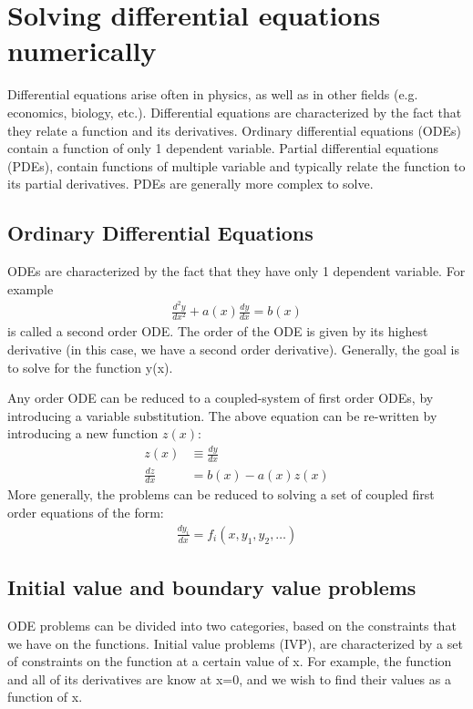 \chapter{Solving differential equations numerically}
Differential equations arise often in physics, as well as in other fields (e.g. economics, biology, etc.). Differential equations are characterized by the fact that they relate a function and its derivatives. Ordinary differential equations (ODEs) contain a function of only 1 dependent variable. Partial differential equations (PDEs), contain functions of multiple variable and typically relate the function to its partial derivatives. PDEs are generally more complex to solve.

\section{Ordinary Differential Equations}
ODEs are characterized by the fact that they have only 1 dependent variable. For example
\begin{align}
 \frac{d^2y}{dx^2} + a(x) \frac{dy}{dx} = b(x) 
\end{align}
is called a second order ODE. The order of the ODE is given by its highest derivative (in this case, we have a second order derivative). Generally, the goal is to solve for the function y(x). 

Any order ODE can be reduced to a coupled-system of first order ODEs, by introducing a variable substitution. The above equation can be re-written by introducing a new function $z(x)$:
\begin{align}
 z(x)&\equiv\frac{dy}{dx} \nonumber\\
 \frac{dz}{dx}&= b(x)-a(x)z(x) 
\end{align}
More generally, the problems can be reduced to solving a set of coupled first order equations of the form:
\begin{align}
 \frac{dy_i}{dx} = f_i(x, y_1,y_2,\ldots )
\end{align}

\section{Initial value and boundary value problems}
ODE problems can be divided into two categories, based on the constraints that we have on the functions. Initial value problems (IVP), are characterized by a set of constraints on the function at a certain value of x. For example, the function and all of its derivatives are know at x=0, and we wish to find their values as a function of x. 

